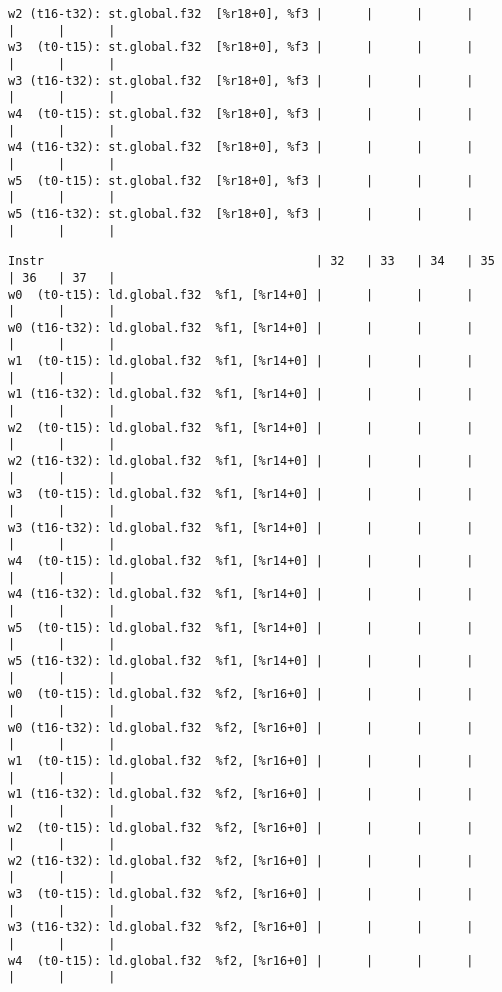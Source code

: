 \documentclass[11pt]{article}
\begin{document}
\begin{Answer}
\begin{verbatim}
w2 (t16-t32): st.global.f32  [%r18+0], %f3 |      |      |      |      |      |      |
w3  (t0-t15): st.global.f32  [%r18+0], %f3 |      |      |      |      |      |      |
w3 (t16-t32): st.global.f32  [%r18+0], %f3 |      |      |      |      |      |      |
w4  (t0-t15): st.global.f32  [%r18+0], %f3 |      |      |      |      |      |      |
w4 (t16-t32): st.global.f32  [%r18+0], %f3 |      |      |      |      |      |      |
w5  (t0-t15): st.global.f32  [%r18+0], %f3 |      |      |      |      |      |      |
w5 (t16-t32): st.global.f32  [%r18+0], %f3 |      |      |      |      |      |      |
\end{verbatim}
\newpage
\begin{verbatim}
Instr                                      | 32   | 33   | 34   | 35   | 36   | 37   |
w0  (t0-t15): ld.global.f32  %f1, [%r14+0] |      |      |      |      |      |      |
w0 (t16-t32): ld.global.f32  %f1, [%r14+0] |      |      |      |      |      |      |
w1  (t0-t15): ld.global.f32  %f1, [%r14+0] |      |      |      |      |      |      |
w1 (t16-t32): ld.global.f32  %f1, [%r14+0] |      |      |      |      |      |      |
w2  (t0-t15): ld.global.f32  %f1, [%r14+0] |      |      |      |      |      |      |
w2 (t16-t32): ld.global.f32  %f1, [%r14+0] |      |      |      |      |      |      |
w3  (t0-t15): ld.global.f32  %f1, [%r14+0] |      |      |      |      |      |      |
w3 (t16-t32): ld.global.f32  %f1, [%r14+0] |      |      |      |      |      |      |
w4  (t0-t15): ld.global.f32  %f1, [%r14+0] |      |      |      |      |      |      |
w4 (t16-t32): ld.global.f32  %f1, [%r14+0] |      |      |      |      |      |      |
w5  (t0-t15): ld.global.f32  %f1, [%r14+0] |      |      |      |      |      |      |
w5 (t16-t32): ld.global.f32  %f1, [%r14+0] |      |      |      |      |      |      |
w0  (t0-t15): ld.global.f32  %f2, [%r16+0] |      |      |      |      |      |      |
w0 (t16-t32): ld.global.f32  %f2, [%r16+0] |      |      |      |      |      |      |
w1  (t0-t15): ld.global.f32  %f2, [%r16+0] |      |      |      |      |      |      |
w1 (t16-t32): ld.global.f32  %f2, [%r16+0] |      |      |      |      |      |      |
w2  (t0-t15): ld.global.f32  %f2, [%r16+0] |      |      |      |      |      |      |
w2 (t16-t32): ld.global.f32  %f2, [%r16+0] |      |      |      |      |      |      |
w3  (t0-t15): ld.global.f32  %f2, [%r16+0] |      |      |      |      |      |      |
w3 (t16-t32): ld.global.f32  %f2, [%r16+0] |      |      |      |      |      |      |
w4  (t0-t15): ld.global.f32  %f2, [%r16+0] |      |      |      |      |      |      |

\end{verbatim}
\end{Answer}
\end{document}
